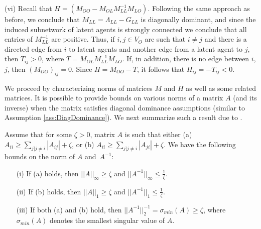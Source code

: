 \documentclass[opre,nonblindrev]{informs3} %
\begin{document}
\begin{APPENDIX}{}
(vi)
Recall that
$H=(M_{OO}-M_{OL}M_{LL}^{-1} M_{LO})$.
Following the same approach as before, we conclude that $M_{LL}=\Lambda_{LL}-G_{LL}$ is diagonally dominant, and
since the induced subnetwork of latent agents is strongly connected
we conclude that all entries of  $M_{LL}^{-1}$ are positive.
Thus, if $i,j\in V_O$
are
such that $i\neq j$ and
there is a directed edge from $i$ to latent agents and another edge from a latent agent to $j$, then
$T_{ij}>0$, where $T=M_{OL}M_{LL}^{-1} M_{LO}$.
If, in addition, there is no edge between $i$, $j$, then $(M_{OO})_{ij}=0$.
Since $H=M_{OO}-T$, it follows that $H_{ij}=-T_{ij}<0$.
\hfill \Halmos
\endproof 	
 	
 
 We proceed by characterizing norms of matrices   $M$ and $H$ as well as some related matrices.
 It is possible to provide bounds on 
 various norms of
 a matrix 
 $A$
 (and its inverse)
 when the matrix satisfies diagonal dominance assumptions (similar to Assumption \ref{ass:DiagDominance}). We next summarize such a result due to \citet{VARAH19753}.
 
 \begin{theorem} \label{theo:implicationsOfDiagDom}
 	Assume that for some $\zeta >0$, matrix $A$ is such that
 	either (a)
 	$A_{ii} \geq \sum_{j| j\neq i} |A_{ij}|  + \zeta $, or
 	(b) 	$A_{ii} \geq \sum_{j| j\neq i} |A_{ji}| + \zeta$.
 	We have the following bounds on the norm of $A$ and~$A^{-1}$:
 	\begin{itemize}
 		\item[(i)] If (a) holds, then
 		$||A||_\infty \geq \zeta$ and
 		$||A^{-1} || _\infty \leq \frac{1}{\zeta}$.
 		\item[(ii)] If  (b) holds, then
 		$||A||_1 \geq \zeta$ and
 		$||A^{-1}||_1 \leq \frac{1}{\zeta} $.
 		\item[(iii)] If  both (a) and (b) hold, then
 		$|| A^{-1}||_2^{-1}= \sigma_{min}(A) \geq \zeta  $, where $\sigma_{min}(A)$ denotes the smallest singular value of $A$.
 	\end{itemize}
 \end{theorem}
 

\end{APPENDIX}
\end{document}
